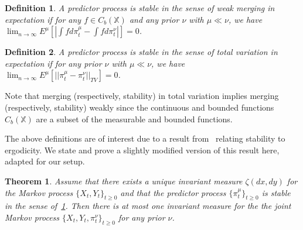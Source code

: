 \documentclass{article}
\newtheorem{theorem}{Theorem}[section]
\newtheorem{definition}{Definition}[section]
\begin{document}
\begin{definition}\label{definition:weak_stable}
    A predictor process is stable in the sense of weak merging in expectation if for any \( f \in C_b(\mathbb{X}) \) and any prior \( \nu \) with \( \mu \ll \nu \), we have \( \lim_{n \to \infty}E^\mu [|\int fd\pi_t^\mu - \int fd\pi_t^\nu|] = 0 \).
\end{definition}

\begin{definition}\label{definition:TV_stable}
    A predictor process is stable in the sense of total variation in expectation if for any prior \( \nu \) with \( \mu \ll \nu \), we have \( \lim_{n \to \infty}E^\mu [||\pi_t^\mu - \pi_t^\nu||_{TV}] = 0 \).
\end{definition}

Note that merging (respectively, stability) in total variation implies merging (respectively, stability) weakly since the continuous and bounded functions \( C_b(\mathbb{X}) \) are a subset of the measurable and bounded functions.

The above definitions are of interest due to a result from~\cite[Theorem 2]{Stettner} relating stability to ergodicity. We state and prove a slightly modified version of this result here, adapted for our setup.

\begin{theorem}\label{theorem:unique}
    Assume that there exists a unique invariant measure \( \zeta(dx,dy) \) for the Markov process \( \{X_t,Y_t\}_{t\ge0} \) and that the predictor process \( \{\pi_t^\mu \}_{t\ge0} \) is stable in the sense of~\ref{definition:weak_stable}. Then there is at most one invariant measure for the the joint Markov process \( \{X_t,Y_t,\pi_t^\nu \}_{t\ge0} \) for any prior \( \nu \).
\end{theorem}
\end{document}
